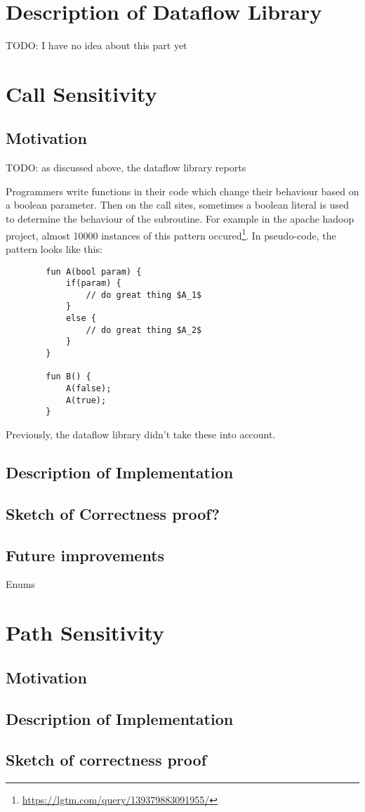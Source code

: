 \newpage
\section{Description of Dataflow Library}
TODO: I have no idea about this part yet

\newpage
\section{Call Sensitivity}
\subsection{Motivation}
TODO: as discussed above, the dataflow library reports 

Programmers write functions in their code which change their behaviour based on 
a boolean parameter.
Then on the call sites, sometimes a boolean literal is used to determine the behaviour
of the subroutine.
For example in the apache hadoop project, almost 10000 instances of this
pattern occured\footnote{\url{https://lgtm.com/query/139379883091955/}}.
In pseudo-code, the pattern looks like this:
\begin{verbatim}
        fun A(bool param) {
            if(param) {
                // do great thing $A_1$
            }
            else {
                // do great thing $A_2$
            }
        }

        fun B() {
            A(false);
            A(true);
        }
\end{verbatim}


Previously, the dataflow library didn't take these into account.


\subsection{Description of Implementation}
\subsection{Sketch of Correctness proof?}
\subsection{Future improvements}
Enums

\newpage
\section{Path Sensitivity}
\subsection{Motivation}
\subsection{Description of Implementation}
\subsection{Sketch of correctness proof}




